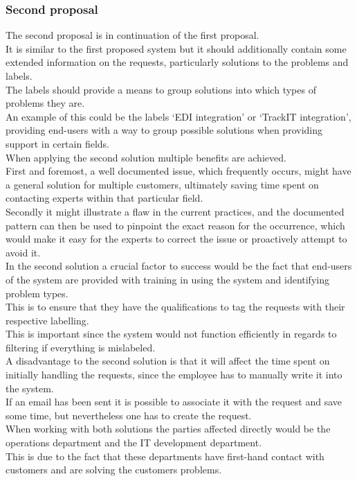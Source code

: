 \subsubsection{Second proposal}
The second proposal is in continuation of the first proposal.\\
It is similar to the first proposed system but it should additionally contain some extended information on the requests, particularly solutions to the problems and labels.\\
The labels should provide a means to group solutions into which types of problems they are.\\
An example of this could be the labels ‘EDI integration’ or ‘TrackIT integration’, providing end-users with a way to group possible solutions when providing support in certain fields.\\
When applying the second solution multiple benefits are achieved.\\
First and foremost, a well documented issue, which frequently occurs, might have a general solution for multiple customers, ultimately saving time spent on contacting experts within that particular field. \\
Secondly it might illustrate a flaw in the current practices, and the documented pattern can then be used to pinpoint the exact reason for the occurrence, which would make it easy for the experts to correct the issue or proactively attempt to avoid it.\\
In the second solution a crucial factor to success would be the fact that end-users of the system are provided with training in using the system and identifying problem types.\\
This is to ensure that they have the qualifications to tag the requests with their respective labelling.\\
This is important since the system would not function efficiently in regards to filtering if everything is mislabeled.\\
A disadvantage to the second solution is that it will affect the time spent on initially handling the requests, since the employee has to manually write it into the system.\\
If an email has been sent it is possible to associate it with the request and save some time, but nevertheless one has to create the request.\\
When working with both solutions the parties affected directly would be the operations department and the IT development department.\\
This is due to the fact that these departments have first-hand contact with customers and are solving the customers problems.


